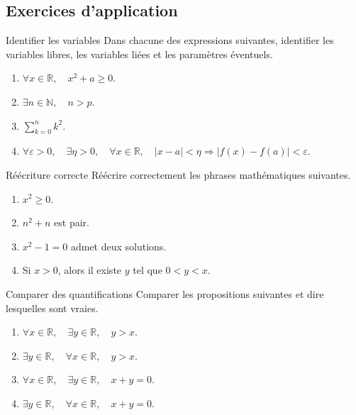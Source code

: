 \documentclass[11pt,a4paper]{article}
\begin{document}
\subsection{Exercices d'application}

\begin{exercicebox}{Identifier les variables}{}
Dans chacune des expressions suivantes, identifier les variables libres, les variables liées et les paramètres éventuels.
\begin{enumerate}
    \item $\forall x\in\mathbb{R},\quad x^2+a\geq 0$.
    \item $\exists n\in\mathbb{N},\quad n>p$.
    \item $\sum_{k=0}^{n} k^2$.
    \item $\forall \varepsilon>0,\quad \exists \eta>0,\quad \forall x\in\mathbb{R},\quad |x-a|<\eta \Rightarrow |f(x)-f(a)|<\varepsilon$.
\end{enumerate}
\end{exercicebox}

\begin{exercicebox}{Réécriture correcte}{}
Réécrire correctement les phrases mathématiques suivantes.
\begin{enumerate}
    \item $x^2\geq 0$.
    \item $n^2+n$ est pair.
    \item $x^2-1=0$ admet deux solutions.
    \item Si $x>0$, alors il existe $y$ tel que $0<y<x$.
\end{enumerate}
\end{exercicebox}

\begin{exercicebox}{Comparer des quantifications}{}
Comparer les propositions suivantes et dire lesquelles sont vraies.
\begin{enumerate}
    \item $\forall x\in\mathbb{R},\quad \exists y\in\mathbb{R},\quad y>x$.
    \item $\exists y\in\mathbb{R},\quad \forall x\in\mathbb{R},\quad y>x$.
    \item $\forall x\in\mathbb{R},\quad \exists y\in\mathbb{R},\quad x+y=0$.
    \item $\exists y\in\mathbb{R},\quad \forall x\in\mathbb{R},\quad x+y=0$.
\end{enumerate}
\end{exercicebox}
\end{document}
